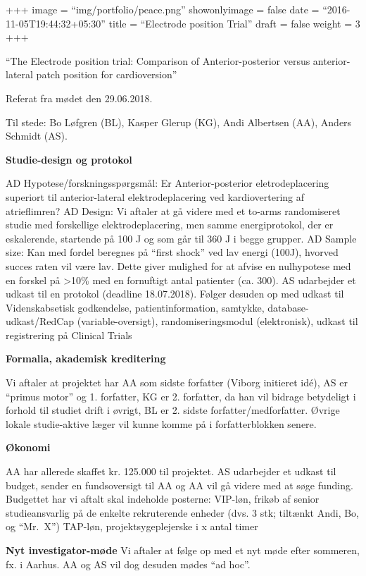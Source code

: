 \documentclass[]{article}
\title{}
\author{}
\date{}
\begin{document}
+++ image = ``img/portfolio/peace.png'' showonlyimage = false date =
``2016-11-05T19:44:32+05:30'' title = ``Electrode position Trial'' draft
= false weight = 3 +++

``The Electrode position trial: Comparison of Anterior-posterior versus
anterior-lateral patch position for cardioversion''

Referat fra mødet den 29.06.2018.

Til stede: Bo Løfgren (BL), Kasper Glerup (KG), Andi Albertsen (AA),
Anders Schmidt (AS).

\textbf{Studie-design og protokol}

AD Hypotese/forskningsspørgsmål: Er Anterior-posterior eletrodeplacering
superiort til anterior-lateral elektrodeplacering ved kardiovertering af
atrieflimren? AD Design: Vi aftaler at gå videre med et to-arms
randomiseret studie med forskellige elektrodeplacering, men samme
energiprotokol, der er eskalerende, startende på 100 J og som går til
360 J i begge grupper. AD Sample size: Kan med fordel beregnes på
``first shock'' ved lav energi (100J), hvorved succes raten vil være
lav. Dette giver mulighed for at afvise en nulhypotese med en forskel på
\textgreater{}10\% med en fornuftigt antal patienter (ca. 300). AS
udarbejder et udkast til en protokol (deadline 18.07.2018). Følger
desuden op med udkast til Videnskabsetisk godkendelse,
patientinformation, samtykke, database-udkast/RedCap
(variable-oversigt), randomiseringsmodul (elektronisk), udkast til
registrering på Clinical Trials

\textbf{Formalia, akademisk kreditering}

Vi aftaler at projektet har AA som sidste forfatter (Viborg initieret
idé), AS er ``primus motor'' og 1. forfatter, KG er 2. forfatter, da han
vil bidrage betydeligt i forhold til studiet drift i øvrigt, BL er 2.
sidste forfatter/medforfatter. Øvrige lokale studie-aktive læger vil
kunne komme på i forfatterblokken senere.

\textbf{Økonomi}

AA har allerede skaffet kr. 125.000 til projektet. AS udarbejder et
udkast til budget, sender en fundsoversigt til AA og AA vil gå videre
med at søge funding. Budgettet har vi aftalt skal indeholde posterne:
VIP-løn, frikøb af senior studieansvarlig på de enkelte rekruterende
enheder (dvs. 3 stk; tiltænkt Andi, Bo, og ``Mr.~X'') TAP-løn,
projektsygeplejerske i x antal timer

\textbf{Nyt investigator-møde} Vi aftaler at følge op med et nyt møde
efter sommeren, fx. i Aarhus. AA og AS vil dog desuden mødes ``ad hoc''.
\end{document}
